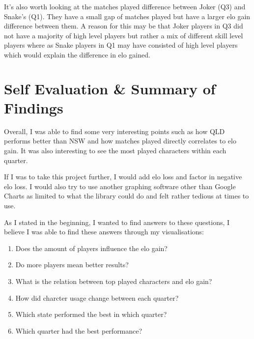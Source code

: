 \documentclass[11pt, oneside, a4paper]{article}
\begin{document}
It's also worth looking at the matches played difference between Joker (Q3) and Snake's (Q1). They have a small gap of matches played but have a larger elo gain difference between them. A reason for this may be that Joker players in Q3 did not have a majority of high level players but rather a mix of different skill level players where as Snake players in Q1 may have consisted of high level players which would explain the difference in elo gained.

\newpage
\section{Self Evaluation \& Summary of Findings}
Overall, I was able to find some very interesting points such as how QLD performs better than NSW and how matches played directly correlates to elo gain. It was also interesting to see the most played characters within each quarter. 

If I was to take this project further, I would add elo loss and factor in negative elo loss. I would also try to use another graphing software other than Google Charts as limited to what the library could do and felt rather tedious at times to use. 

As I stated in the beginning, I wanted to find answers to these questions, I believe I was able to find these answers through my visualisations:
\begin{enumerate}
    \item Does the amount of players influence the elo gain?
    \item Do more players mean better results?
    \item What is the relation between top played characters and elo gain?
    \item How did charcter usage change between each quarter?
    \item Which state performed the best in which quarter?
    \item Which quarter had the best performance?
\end{enumerate}
\end{document}

